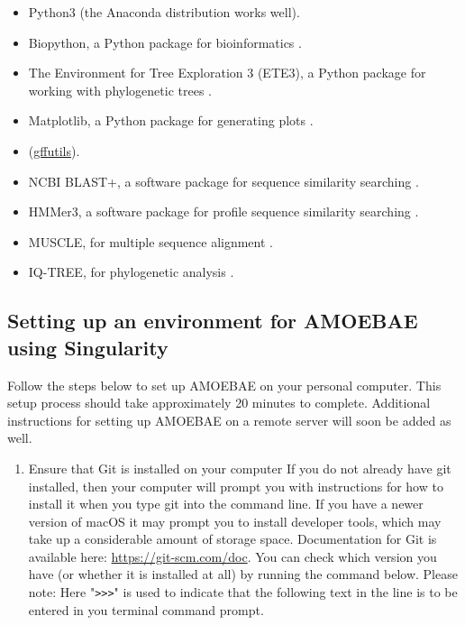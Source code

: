 \documentclass[12pt,letterpaper]{article}
\begin{document}
\begin{linenumbers}
\begin{itemize}

\item Python3 (the Anaconda distribution works well).

\item Biopython, a Python package for bioinformatics \citep{cock2009}.

\item The Environment for Tree Exploration 3 (ETE3), a Python package for
    working with phylogenetic trees \citep{huerta-cepas2016}.

\item Matplotlib, a Python package for generating plots \citep{hunter2007}.

\item (\href{https://pythonhosted.org/gffutils/}{gffutils}).

\item NCBI BLAST+, a software package for sequence similarity searching \citep{camacho2009}.

\item HMMer3, a software package for profile sequence similarity searching \citep{eddy1998}.

\item MUSCLE, for multiple sequence alignment \citep{edgar2004}.

\item IQ-TREE, for phylogenetic analysis \citep{nguyen2015}.


\end{itemize}


\subsection{Setting up an environment for AMOEBAE using Singularity}
\label{setup_section}


Follow the steps below to set up AMOEBAE on your personal computer. This setup
process should take approximately 20 minutes to complete. Additional instructions for
setting up AMOEBAE on a remote server will soon be added as well.

\begin{enumerate}

\item Ensure that Git is installed on your computer If you do not already have
    git installed, then your computer will prompt you with instructions for how
        to install it when you type git into the command line. If you have a
        newer version of macOS it may prompt you to install developer tools,
        which may take up a considerable amount of storage space. Documentation
        for Git is available here: \url{https://git-scm.com/doc}. You can check
        which version you have (or whether it is installed at all) by running
        the command below. Please note: Here "\texttt{>{}>{}>}" is
        used to indicate that the following text in the line is to be entered
        in you terminal command prompt. 


\end{enumerate}
\end{linenumbers}
\end{document}
